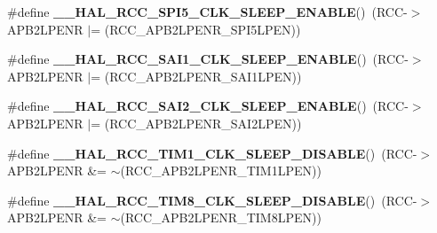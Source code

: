 \begin{DoxyCompactItemize}
\item 
\mbox{\label{group___r_c_c_ex___peripheral___clock___sleep___enable___disable_gaf0183ac6107344a8dcc43e1ab795644b}} 
\#define {\bfseries \+\_\+\+\_\+\+H\+A\+L\+\_\+\+R\+C\+C\+\_\+\+S\+P\+I5\+\_\+\+C\+L\+K\+\_\+\+S\+L\+E\+E\+P\+\_\+\+E\+N\+A\+B\+LE}()~(R\+CC-\/$>$A\+P\+B2\+L\+P\+E\+NR $\vert$= (R\+C\+C\+\_\+\+A\+P\+B2\+L\+P\+E\+N\+R\+\_\+\+S\+P\+I5\+L\+P\+EN))
\item 
\mbox{\label{group___r_c_c_ex___peripheral___clock___sleep___enable___disable_gaeb86a4570fd6d66626d25d45b7e9d86e}} 
\#define {\bfseries \+\_\+\+\_\+\+H\+A\+L\+\_\+\+R\+C\+C\+\_\+\+S\+A\+I1\+\_\+\+C\+L\+K\+\_\+\+S\+L\+E\+E\+P\+\_\+\+E\+N\+A\+B\+LE}()~(R\+CC-\/$>$A\+P\+B2\+L\+P\+E\+NR $\vert$= (R\+C\+C\+\_\+\+A\+P\+B2\+L\+P\+E\+N\+R\+\_\+\+S\+A\+I1\+L\+P\+EN))
\item 
\mbox{\label{group___r_c_c_ex___peripheral___clock___sleep___enable___disable_ga367f58b538b321e6b931b0157e116873}} 
\#define {\bfseries \+\_\+\+\_\+\+H\+A\+L\+\_\+\+R\+C\+C\+\_\+\+S\+A\+I2\+\_\+\+C\+L\+K\+\_\+\+S\+L\+E\+E\+P\+\_\+\+E\+N\+A\+B\+LE}()~(R\+CC-\/$>$A\+P\+B2\+L\+P\+E\+NR $\vert$= (R\+C\+C\+\_\+\+A\+P\+B2\+L\+P\+E\+N\+R\+\_\+\+S\+A\+I2\+L\+P\+EN))
\item 
\mbox{\label{group___r_c_c_ex___peripheral___clock___sleep___enable___disable_ga990bf7664ac6c430c239eab292ec7ed5}} 
\#define {\bfseries \+\_\+\+\_\+\+H\+A\+L\+\_\+\+R\+C\+C\+\_\+\+T\+I\+M1\+\_\+\+C\+L\+K\+\_\+\+S\+L\+E\+E\+P\+\_\+\+D\+I\+S\+A\+B\+LE}()~(R\+CC-\/$>$A\+P\+B2\+L\+P\+E\+NR \&= $\sim$(R\+C\+C\+\_\+\+A\+P\+B2\+L\+P\+E\+N\+R\+\_\+\+T\+I\+M1\+L\+P\+EN))
\item 
\mbox{\label{group___r_c_c_ex___peripheral___clock___sleep___enable___disable_ga95ea11d39c41c23f619668ce078d4d8d}} 
\#define {\bfseries \+\_\+\+\_\+\+H\+A\+L\+\_\+\+R\+C\+C\+\_\+\+T\+I\+M8\+\_\+\+C\+L\+K\+\_\+\+S\+L\+E\+E\+P\+\_\+\+D\+I\+S\+A\+B\+LE}()~(R\+CC-\/$>$A\+P\+B2\+L\+P\+E\+NR \&= $\sim$(R\+C\+C\+\_\+\+A\+P\+B2\+L\+P\+E\+N\+R\+\_\+\+T\+I\+M8\+L\+P\+EN))

\end{DoxyCompactItemize}
